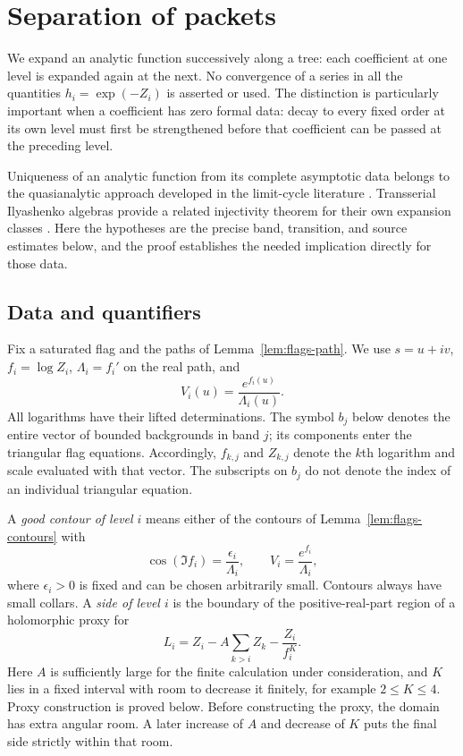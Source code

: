 \section{Separation of packets}\label{sec:separation}


We expand an analytic function successively along a tree: each
coefficient at one level is expanded again at the next.  No convergence
of a series in all the quantities
$h_i=\exp(-Z_i)$ is asserted or used.  The distinction is particularly
important when a coefficient has zero formal data: decay to every fixed
order at its own level must first be strengthened before that coefficient
can be passed at the preceding level.

Uniqueness of an analytic function from its complete asymptotic data
belongs to the quasianalytic approach developed in the
limit-cycle literature \citep{Ilyashenko1991,Ecalle1992}.
Transserial Ilyashenko algebras provide a related injectivity theorem
for their own expansion classes \citep{GalalKaiserSpeissegger2020}.
Here the hypotheses are the precise band, transition, and source
estimates below, and the proof establishes the needed implication
directly for those data.

\subsection{Data and quantifiers}

Fix a saturated flag and the paths of Lemma~\ref{lem:flags-path}.
We use $s=u+iv$, $f_i=\log Z_i$, $\Lambda_i=f_i'$ on the real
path, and
\[
 V_i(u)=\frac{e^{f_i(u)}}{\Lambda_i(u)}.
\]
All logarithms have their lifted determinations.  The symbol $b_j$
below denotes the entire vector of bounded backgrounds in band $j$;
its components enter the triangular flag equations.  Accordingly,
$f_{k,j}$ and $Z_{k,j}$ denote the $k$th logarithm and scale evaluated with
that vector.  The subscripts on $b_j$ do not denote the index of an
individual triangular equation.

A \emph{good contour of level $i$} means either of the contours
of Lemma~\ref{lem:flags-contours} with
\begin{equation}\label{eq:separation-good}
 \cos(\Im f_i)=\frac{\epsilon_i}{\Lambda_i},\qquad
 V_i=\frac{e^{f_i}}{\Lambda_i},
\end{equation}
where $\epsilon_i>0$ is fixed and can be chosen arbitrarily small.
Contours always have small collars.  A \emph{side of level $i$}
is the boundary of the positive-real-part region of a holomorphic
proxy for
\begin{equation}\label{eq:separation-barrier}
 L_i=Z_i-A\sum_{k>i}Z_k-\frac{Z_i}{f_i^K}.
\end{equation}
Here $A$ is sufficiently large for the finite calculation under
consideration, and $K$ lies in a fixed interval with room to decrease
it finitely, for example $2\leq K\leq4$.  Proxy construction is proved
below.  Before constructing the proxy, the domain has extra angular
room.  A later increase of $A$ and decrease of $K$ puts the final side
strictly within that room.

